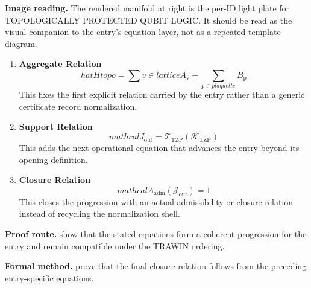 \begin{samepage}
\noindent\begin{minipage}[t]{0.45\linewidth}
\vspace{0pt}
\raggedright
\scriptsize\textbf{Image reading.} The rendered manifold at right is the per-ID light plate for TOPOLOGICALLY PROTECTED QUBIT LOGIC. It should be read as the visual companion to the entry's equation layer, not as a repeated template diagram.\par
\end{minipage}\hfill
\begin{minipage}[t]{0.53\linewidth}
\vspace*{-0.10in}
\raggedright
{}
\end{minipage}
\end{samepage}

\clearpage


\begin{enumerate}[leftmargin=1.6em,itemsep=9pt,topsep=6pt]
\item \textbf{Aggregate Relation}
\[
hat{H} {topo} = \sum {v \in lattice} A_{\mathrm{v}} + \sum_{p \in plaquette} B_{\mathrm{p}}
\]
This fixes the first explicit relation carried by the entry rather than a generic certificate record normalization.

\item \textbf{Support Relation}
\[
mathcal{J}_{\mathrm{out}} = \mathcal{T}_{\mathrm{TZP}}\!\left(\mathcal{K}_{\mathrm{TZP}}\right)
\]
This adds the next operational equation that advances the entry beyond its opening definition.

\item \textbf{Closure Relation}
\[
mathcal{A}_{\mathrm{adm}}\!\left(\mathcal{J}_{\mathrm{out}}\right)=1
\]
This closes the progression with an actual admissibility or closure relation instead of recycling the normalization shell.
\end{enumerate}

\textbf{Proof route.} show that the stated equations form a coherent progression for the entry and remain compatible under the TRAWIN ordering.

\textbf{Formal method.} prove that the final closure relation follows from the preceding entry-specific equations.

\medskip
{}

